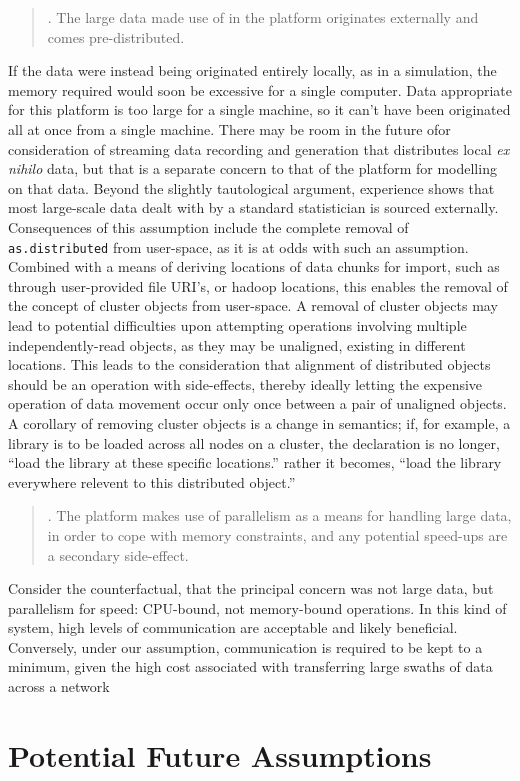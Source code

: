 \documentclass[10pt, a4paper]{article}
\newcounter{assumption}[section]
\newcommand{\assume}[1]{\begin{quote}
\centering
\stepcounter{assumption}
\arabic{assumption}. {#1}
\end{quote}}
\begin{document}
\assume{The large data made use of in the platform originates externally and
comes pre-distributed.}
If the data were instead being originated entirely locally, as in a simulation,
the memory required would soon be excessive for a single computer.
Data appropriate for this platform is too large for a single machine, so it
can't have been originated all at once from a single machine.
There may be room in the future ofor consideration of streaming data recording
and generation that distributes local \textit{ex nihilo} data, but that is a
separate concern to that of the platform for modelling on that data.
Beyond the slightly tautological argument, experience shows that most
large-scale data dealt with by a standard statistician is sourced externally.
Consequences of this assumption include the complete removal of
\texttt{as.distributed} from user-space, as it is at odds with such an
assumption.
Combined with a means of deriving locations of data chunks for import, such as
through user-provided file URI's, or hadoop locations, this enables the removal
of the concept of cluster objects from user-space.
A removal of cluster objects may lead to potential difficulties upon attempting
operations involving multiple independently-read objects, as they may be
unaligned, existing in different locations.
This leads to the consideration that alignment of distributed objects should be
an operation with side-effects, thereby ideally letting the expensive operation
of data movement occur only once between a pair of unaligned objects.
A corollary of removing cluster objects is a change in semantics; if, for
example, a library is to be loaded across all nodes on a cluster, the
declaration is no longer, ``load the library at these specific locations.''
rather it becomes, ``load the library everywhere relevent to this distributed
object.''

\assume{The platform makes use of parallelism as a means for handling large
data, in order to cope with memory constraints, and any potential speed-ups are
a secondary side-effect.}
Consider the counterfactual, that the principal concern was not large data, but
parallelism for speed: CPU-bound, not memory-bound operations.
In this kind of system, high levels of communication are acceptable and likely
beneficial.
Conversely, under our assumption, communication is required to be kept to a
minimum, given the high cost associated with transferring large swaths of data
across a network

\section{Potential Future Assumptions}\label{sec:potential}
\end{document}
